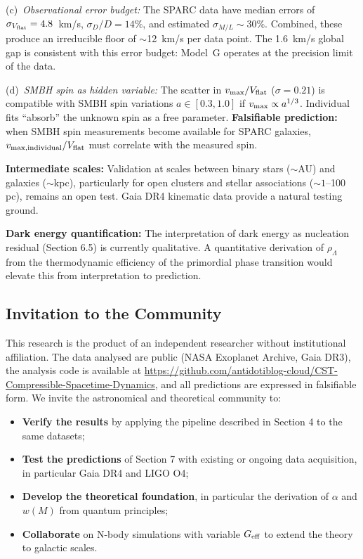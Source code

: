 \documentclass[11pt,a4paper]{article}
\providecommand{\tightlist}{\setlength{\itemsep}{0pt}\setlength{\parskip}{0pt}}
\begin{document}
(c)~\textit{Observational error budget:} The SPARC data have median errors of $\sigma_{V_{\rm flat}} = 4.8$~km/s, $\sigma_D/D = 14\%$, and estimated $\sigma_{M/L} \sim 30\%$. Combined, these produce an irreducible floor of $\sim$12~km/s per data point. The 1.6~km/s global gap is consistent with this error budget: Model~G operates at the precision limit of the data.

(d)~\textit{SMBH spin as hidden variable:} The scatter in $v_{\rm max}/V_{\rm flat}$ ($\sigma = 0.21$) is compatible with SMBH spin variations $a \in [0.3, 1.0]$ if $v_{\rm max} \propto a^{1/3}$. Individual fits ``absorb'' the unknown spin as a free parameter. \textbf{Falsifiable prediction:} when SMBH spin measurements become available for SPARC galaxies, $v_{\rm max,individual}/V_{\rm flat}$ must correlate with the measured spin.

\textbf{Intermediate scales:} Validation at scales between binary stars (\(\sim\)AU) and galaxies (\(\sim\)kpc), particularly for open clusters and stellar associations (\(\sim 1\)--100 pc), remains an open test. Gaia DR4 kinematic data provide a natural testing ground.

\textbf{Dark energy quantification:} The interpretation of dark energy as nucleation residual (Section 6.5) is currently qualitative. A quantitative derivation of \(\rho_\Lambda\) from the thermodynamic efficiency of the primordial phase transition would elevate this from interpretation to prediction.

\hypertarget{invitation-to-the-community}{%
\subsection{Invitation to the
Community}\label{invitation-to-the-community}}

This research is the product of an independent researcher without
institutional affiliation. The data analysed are public (NASA Exoplanet
Archive, Gaia DR3), the analysis code is available at \url{https://github.com/antidotiblog-cloud/CST-Compressible-Spacetime-Dynamics}, and all predictions are expressed in
falsifiable form. We invite the astronomical and theoretical community
to:

\begin{itemize}
\tightlist
\item
  \textbf{Verify the results} by applying the pipeline described in
  Section 4 to the same datasets;
\item
  \textbf{Test the predictions} of Section 7 with existing or ongoing
  data acquisition, in particular Gaia DR4 and LIGO O4;
\item
  \textbf{Develop the theoretical foundation}, in particular the
  derivation of \(\alpha\) and \(w(M)\) from quantum principles;
\item
  \textbf{Collaborate} on N-body simulations with variable
  \(G_{\rm eff}\) to extend the theory to galactic scales.
\end{itemize}
\end{document}

